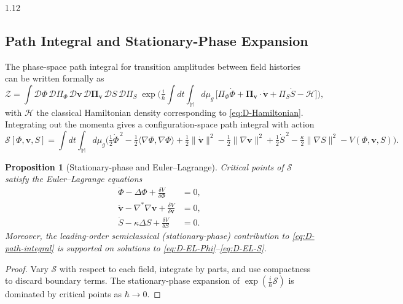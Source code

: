 \documentclass[12pt,a4paper]{article}
\numberwithin{equation}{section}
\newtheorem{proposition}{Proposition}[section]
\theoremstyle{remark}
\theoremstyle{definition}
\begin{document}
\begin{spacing}{1.12}
\subsection{Path Integral and Stationary-Phase Expansion}\label{sec:D-path}

The phase-space path integral for transition amplitudes between field histories can be written formally as
\begin{equation}\label{eq:D-path-integral}
\mathcal{Z}\!=\!\!\int\!\mathcal{D}\Phi\,\mathcal{D}\Pi_\Phi\,\mathcal{D}\mathbf{v}\,\mathcal{D}\bm{\Pi}_{\!\mathbf{v}}\,
\mathcal{D}S\,\mathcal{D}\Pi_S\;
\exp\!\Big(\tfrac{i}{\hbar}\!\int\!dt\!\int_{\mathbb{M}}\!\! d\mu_g\,\big[\Pi_\Phi\dot{\Phi}
+\bm{\Pi}_{\!\mathbf{v}}\!\cdot\!\dot{\mathbf{v}}
+\Pi_S\dot{S}-\mathcal{H}\big]\Big),
\end{equation}
with $\mathcal{H}$ the classical Hamiltonian density corresponding to \eqref{eq:D-Hamiltonian}. Integrating out the momenta gives a configuration-space path integral with action
\begin{equation}\label{eq:D-action}
\mathcal{S}[\Phi,\mathbf{v},S]\!=\!\int dt\!\int_{\mathbb{M}}\!\! d\mu_g
\Big(\tfrac12\dot{\Phi}^{\,2}-\tfrac12\langle\nabla \Phi,\nabla \Phi\rangle
+\tfrac12\|\dot{\mathbf{v}}\|^2-\tfrac12\|\nabla \mathbf{v}\|^2
+\tfrac12\dot{S}^{\,2}-\tfrac{\kappa}{2}\|\nabla S\|^2- V(\Phi,\mathbf{v},S)\Big).
\end{equation}

\begin{proposition}[Stationary-phase and Euler--Lagrange]\label{prop:D-stationary}
Critical points of $\mathcal{S}$ satisfy the Euler--Lagrange equations
\begin{align}
\ddot{\Phi}-\Delta \Phi + \frac{\delta V}{\delta \Phi}&=0, \label{eq:D-EL-Phi}\\
\ddot{\mathbf{v}}-\nabla^\ast\nabla \mathbf{v}+ \frac{\delta V}{\delta \mathbf{v}}&=0, \label{eq:D-EL-v}\\
\ddot{S}-\kappa \Delta S + \frac{\delta V}{\delta S}&=0. \label{eq:D-EL-S}
\end{align}
Moreover, the leading-order semiclassical (stationary-phase) contribution to \eqref{eq:D-path-integral} is supported on solutions to \eqref{eq:D-EL-Phi}--\eqref{eq:D-EL-S}.
\end{proposition}

\begin{proof}
Vary $\mathcal{S}$ with respect to each field, integrate by parts, and use compactness to discard boundary terms. The stationary-phase expansion of $\exp(\tfrac{i}{\hbar}\mathcal{S})$ is dominated by critical points as $\hbar\to 0$.
\end{proof}


\end{spacing}
\end{document}
